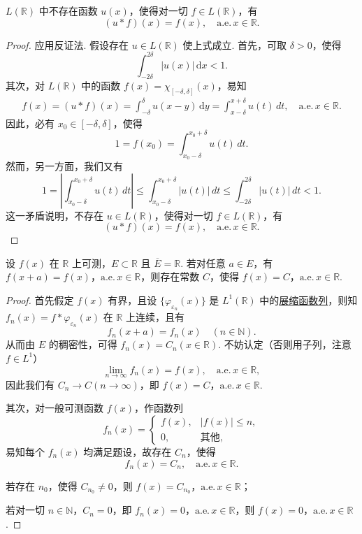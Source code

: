 \documentclass[../../main.tex]{subfiles}
\begin{document}
\begin{proposition}[\( L \) 中无卷积单位]\label{proposition:L中无卷积单位}
\( L(\mathbb{R}) \) 中不存在函数 \( u(x) \)，使得对一切 \( f \in L(\mathbb{R}) \)，有
\[
(u * f)(x) = f(x), \quad \text{a.e.}\, x \in \mathbb{R}.
\]
\end{proposition}
\begin{proof}
应用反证法. 假设存在 \( u \in L(\mathbb{R}) \) 使上式成立. 首先，可取 \( \delta > 0 \)，使得
\[
\int_{-2\delta}^{2\delta} |u(x)| \, \mathrm{d}x < 1.
\]
其次，对 \( L(\mathbb{R}) \) 中的函数 \( f(x) = \chi_{[-\delta, \delta]}(x) \)，易知
\begin{align*}
f(x) = (u * f)(x) = \int_{-\delta}^{\delta} u(x - y) \, \mathrm{d}y = \int_{x - \delta}^{x + \delta} u(t) \, dt, \quad \text{a.e.}\, x \in \mathbb{R}.
\end{align*}
因此，必有 \( x_0 \in [-\delta, \delta] \)，使得
\[
1 = f(x_0) = \int_{x_0 - \delta}^{x_0 + \delta} u(t) \, dt.
\]
然而，另一方面，我们又有
\[
1 = \left| \int_{x_0 - \delta}^{x_0 + \delta} u(t) \, dt \right| \leq \int_{x_0 - \delta}^{x_0 + \delta} |u(t)| \, dt \leq \int_{-2\delta}^{2\delta} |u(t)| \, dt < 1.
\]
这一矛盾说明，不存在 \( u \in L(\mathbb{R}) \)，使得对一切 \( f \in L(\mathbb{R}) \)，有
\[
(u * f)(x) = f(x), \quad \text{a.e.}\, x \in \mathbb{R}.
\]
\end{proof}

\begin{example}
设 \( f(x) \) 在 \( \mathbb{R} \) 上可测，\( E \subset \mathbb{R} \) 且 \( \overline{E} = \mathbb{R} \). 若对任意 \( a \in E \)，有 \( f(x + a) = f(x) \)，\(\text{a.e.}\, x \in \mathbb{R} \)，则存在常数 \( C \)，使得 \( f(x) = C \)，\(\text{a.e.}\, x \in \mathbb{R} \).
\end{example}
\begin{proof}
首先假定 \( f(x) \) 有界，且设 \( \{ \varphi_{\varepsilon_n}(x) \} \) 是 \( L^1(\mathbb{R}) \) 中的\hyperref[definition:展缩函数]{展缩函数列}，则知 \( f_n(x) = f * \varphi_{\varepsilon_n}(x) \) 在 \( \mathbb{R} \) 上连续，且有
\[
f_n(x + a) = f_n(x) \quad (n \in \mathbb{N}).
\]
从而由 \( E \) 的稠密性，可得 \( f_n(x) = C_n (x \in \mathbb{R}) \). 不妨认定（否则用子列，注意 \( f \in L^1 \)）
\[
\lim_{n \to \infty} f_n(x) = f(x), \quad \text{a.e.}\, x \in \mathbb{R},
\]
因此我们有 \( C_n \to C (n \to \infty) \)，即 \( f(x) = C \)，\(\text{a.e.}\, x \in \mathbb{R} \).

其次，对一般可测函数 \( f(x) \)，作函数列
\[
f_n(x) = 
\begin{cases} 
f(x), & |f(x)| \leq n, \\
0, & \text{其他},
\end{cases}
\]
易知每个 \( f_n(x) \) 均满足题设，故存在 \( C_n \)，使得
\[
f_n(x) = C_n, \quad \text{a.e.}\, x \in \mathbb{R}.
\]

若存在 \( n_0 \)，使得 \( C_{n_0} \neq 0 \)，则 \( f(x) = C_{n_0} \)，\(\text{a.e.}\, x \in \mathbb{R} \)；

若对一切 \( n \in \mathbb{N} \)，\( C_n = 0 \)，即 \( f_n(x) = 0 \)，\(\text{a.e.}\, x \in \mathbb{R} \)，则 \( f(x) = 0 \)，\(\text{a.e.}\, x \in \mathbb{R} \).
\end{proof}
\end{document}
